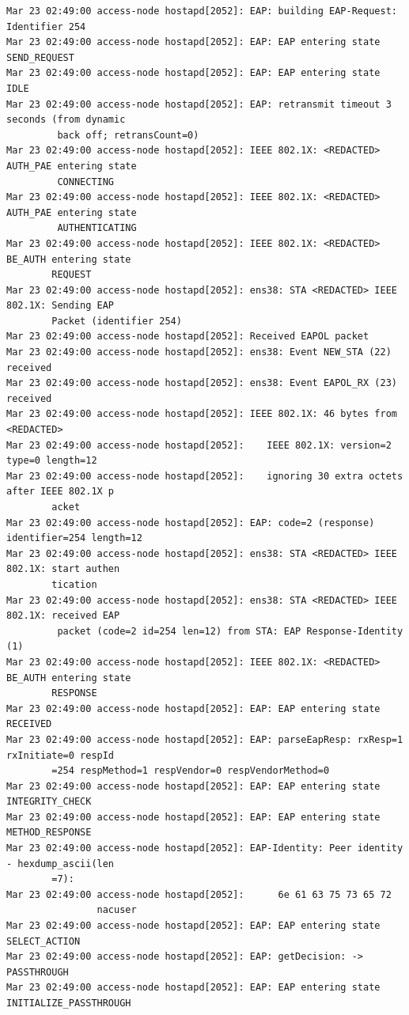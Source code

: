 \documentclass[11pt]{article}
\begin{document}
\begin{verbatim}
Mar 23 02:49:00 access-node hostapd[2052]: EAP: building EAP-Request: Identifier 254
Mar 23 02:49:00 access-node hostapd[2052]: EAP: EAP entering state SEND_REQUEST
Mar 23 02:49:00 access-node hostapd[2052]: EAP: EAP entering state IDLE
Mar 23 02:49:00 access-node hostapd[2052]: EAP: retransmit timeout 3 seconds (from dynamic
         back off; retransCount=0)
Mar 23 02:49:00 access-node hostapd[2052]: IEEE 802.1X: <REDACTED> AUTH_PAE entering state
         CONNECTING
Mar 23 02:49:00 access-node hostapd[2052]: IEEE 802.1X: <REDACTED> AUTH_PAE entering state
         AUTHENTICATING
Mar 23 02:49:00 access-node hostapd[2052]: IEEE 802.1X: <REDACTED> BE_AUTH entering state 
        REQUEST
Mar 23 02:49:00 access-node hostapd[2052]: ens38: STA <REDACTED> IEEE 802.1X: Sending EAP 
        Packet (identifier 254)
Mar 23 02:49:00 access-node hostapd[2052]: Received EAPOL packet
Mar 23 02:49:00 access-node hostapd[2052]: ens38: Event NEW_STA (22) received
Mar 23 02:49:00 access-node hostapd[2052]: ens38: Event EAPOL_RX (23) received
Mar 23 02:49:00 access-node hostapd[2052]: IEEE 802.1X: 46 bytes from <REDACTED>
Mar 23 02:49:00 access-node hostapd[2052]:    IEEE 802.1X: version=2 type=0 length=12
Mar 23 02:49:00 access-node hostapd[2052]:    ignoring 30 extra octets after IEEE 802.1X p
        acket
Mar 23 02:49:00 access-node hostapd[2052]: EAP: code=2 (response) identifier=254 length=12
Mar 23 02:49:00 access-node hostapd[2052]: ens38: STA <REDACTED> IEEE 802.1X: start authen
        tication
Mar 23 02:49:00 access-node hostapd[2052]: ens38: STA <REDACTED> IEEE 802.1X: received EAP
         packet (code=2 id=254 len=12) from STA: EAP Response-Identity (1)
Mar 23 02:49:00 access-node hostapd[2052]: IEEE 802.1X: <REDACTED> BE_AUTH entering state 
        RESPONSE
Mar 23 02:49:00 access-node hostapd[2052]: EAP: EAP entering state RECEIVED
Mar 23 02:49:00 access-node hostapd[2052]: EAP: parseEapResp: rxResp=1 rxInitiate=0 respId
        =254 respMethod=1 respVendor=0 respVendorMethod=0
Mar 23 02:49:00 access-node hostapd[2052]: EAP: EAP entering state INTEGRITY_CHECK
Mar 23 02:49:00 access-node hostapd[2052]: EAP: EAP entering state METHOD_RESPONSE
Mar 23 02:49:00 access-node hostapd[2052]: EAP-Identity: Peer identity - hexdump_ascii(len
        =7):
Mar 23 02:49:00 access-node hostapd[2052]:      6e 61 63 75 73 65 72                      
                nacuser
Mar 23 02:49:00 access-node hostapd[2052]: EAP: EAP entering state SELECT_ACTION
Mar 23 02:49:00 access-node hostapd[2052]: EAP: getDecision: -> PASSTHROUGH
Mar 23 02:49:00 access-node hostapd[2052]: EAP: EAP entering state INITIALIZE_PASSTHROUGH

\end{verbatim}
\end{document}
